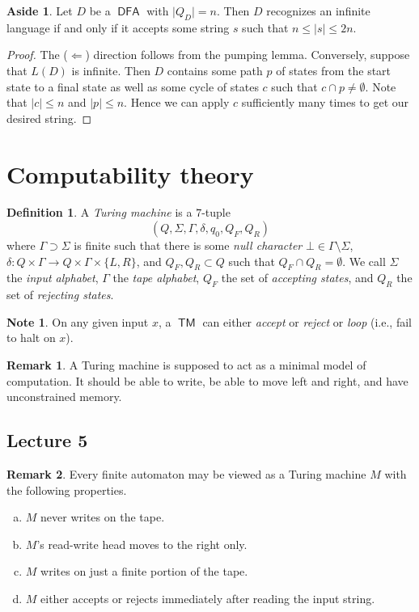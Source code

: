\documentclass[10pt,letterpaper,cm]{nupset}
\theoremstyle{definition}
\newtheorem*{definition}{Definition}
\newtheorem{note}{Note}
\newtheorem{remark}{Remark}
\newtheorem*{aside}{Aside}
\newcommand{\1}{\mathbf{1}}
\newcommand{\0}{\vec 0}
\DeclareMathOperator{\TM}{\mathsf{TM}}
\DeclareMathOperator{\DFA}{\mathsf{DFA}}
\begin{document}
\begin{aside}
Let $D$ be a $\DFA$ with $\lvert{Q_D}\rvert =n$. Then $D$ recognizes an infinite language if and only if it accepts some string $s$ such that $n\leq \lvert{s}\rvert \leq 2n$.
\end{aside}
\begin{proof}
The ($\Longleftarrow$) direction follows from the pumping lemma. Conversely, suppose that $L(D)$ is infinite. Then $D$ contains some path $p$ of states from the start state to a final state as well as some cycle of states $c$ such that $c \cap p \ne \emptyset$. Note that $\lvert{c}\rvert \leq n$ and $\lvert{p}\rvert \leq n$. Hence we can apply $c$ sufficiently many times to get our desired string.
\end{proof}

\section{Computability theory}

\begin{definition}
A \textit{Turing machine} is a $7$-tuple $$(Q, \Sigma, \Gamma, \delta, q_0, Q_F, Q_R)$$ where $\Gamma \supset \Sigma$ is finite such that there is some \textit{null character} $\bot \in \Gamma \setminus \Sigma$, $\delta : Q\times \Gamma \to Q \times \Gamma \times \{L, R\}$, and $Q_F, Q_R \subset Q$ such that $Q_F \cap Q_R = \emptyset$. We call $\Sigma$ the \textit{input alphabet}, $\Gamma$ the \textit{tape alphabet}, $Q_F$ the set of \textit{accepting states}, and $Q_R$ the set of \textit{rejecting states}.
\end{definition}

\begin{note}
On any given input $x$, a $\TM$ can either \textit{accept} or \textit{reject} or \textit{loop} (i.e., fail to halt on $x$).
\end{note}

\begin{remark}
A Turing machine is supposed to act as a minimal model of computation. It should be able to write, be able to move left and right, and have unconstrained memory.
\end{remark}

\subsection{Lecture 5}

\begin{remark}
Every finite automaton may be viewed as a Turing machine $M$ with the following properties. 
\begin{enumerate}[(a)]
\item $M$ never writes on the tape.
\item $M$'s read-write head moves to the right only.
\item $M$ writes on just a finite portion of the tape.
\item $M$ either accepts or rejects immediately after reading the input string. 
\end{enumerate}
\end{remark}
\end{document}

